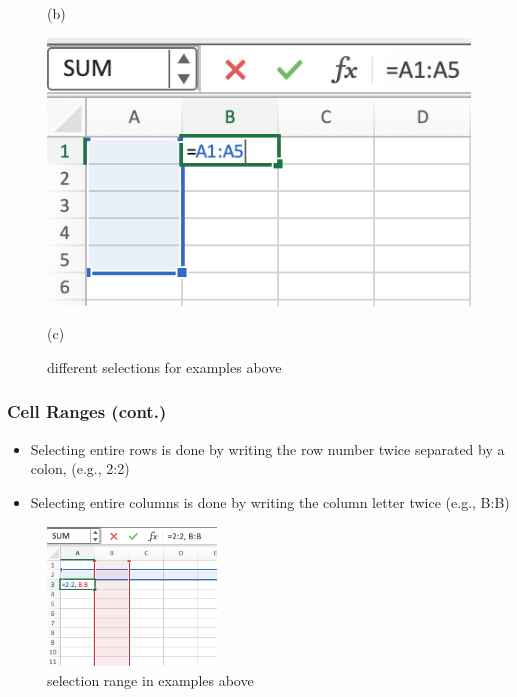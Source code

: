 \documentclass[12pt]{beamer}
\begin{document}
\begin{frame}
\begin{figure}[htb]
\begin{minipage}[t]{0.32\linewidth}
			\medskip
			\centerline{(b)}
		\end{minipage}
	\begin{minipage}[t]{0.32\linewidth}\centering
		\includegraphics[width=0.9\linewidth]{selection3.png}
		\medskip
		\centerline{(c)}
	\end{minipage}
	\caption{different selections for examples above}
	\end{figure}
	\end{frame}
	\begin{frame}	
		\frametitle{Cell Ranges (cont.)}
		\begin{itemize}
				\item Selecting entire rows is done by writing the row number twice separated by a colon, (e.g., 2:2)
				\item Selecting entire columns is done by writing the column letter twice (e.g., B:B)
		\end{itemize}
		\begin{figure}
			\begin{center}
				\includegraphics[width=0.4\textwidth]{rowcolumnselection.png}
			\end{center}
			\caption{selection range in 	examples above}
		\end{figure}
	\end{frame}
\end{document}
